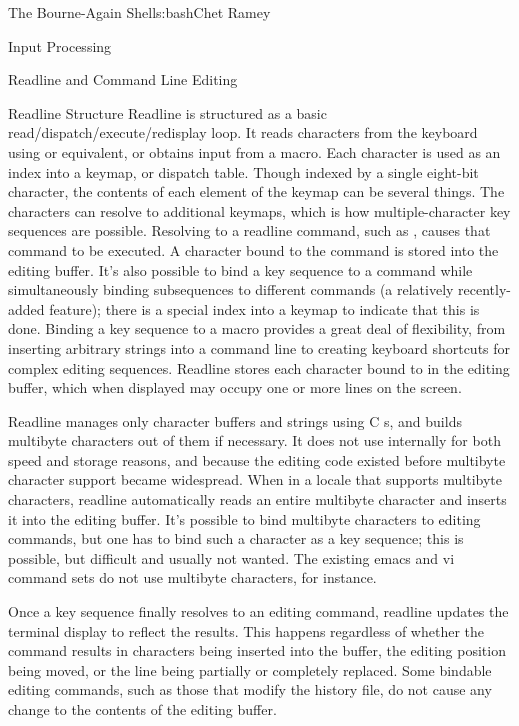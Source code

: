 \begin{aosachapter}{The Bourne-Again Shell}{s:bash}{Chet Ramey}
\begin{aosasect1}{Input Processing}
\begin{aosasect2}{Readline and Command Line Editing}
\begin{aosasect3}{Readline Structure}
Readline is structured as a basic read/dispatch/execute/redisplay
loop.  It reads characters from the keyboard using  or
equivalent, or obtains input from a macro.  Each character is used as
an index into a keymap, or dispatch table.  Though indexed by a single
eight-bit character, the contents of each element of the keymap can be
several things.  The characters can resolve to additional keymaps,
which is how multiple-character key sequences are possible.  Resolving
to a readline command, such as , causes that
command to be executed.
A character bound to the  command is stored into the
editing buffer.
It's also possible to bind a key sequence to
a command while simultaneously binding subsequences to different
commands (a relatively recently-added feature); there is a special
index into a keymap to indicate that this is done.  Binding a key
sequence to a macro provides a great deal of flexibility, from
inserting arbitrary strings into a command line to creating
keyboard shortcuts for complex editing sequences.  Readline stores
each character bound to  in the
editing buffer, which when displayed may occupy one or more lines on
the screen.

Readline manages only character buffers and strings using C
s, and builds multibyte characters out of them if
necessary.  It does not use  internally for both speed
and storage reasons, and because the editing code existed before
multibyte character support became widespread.  When in a locale that
supports multibyte characters, readline automatically reads an entire
multibyte character and inserts it into the editing buffer.  It's
possible to bind multibyte characters to editing commands, but one has
to bind such a character as a key sequence; this is possible, but
difficult and usually not wanted.  The existing emacs and vi command
sets do not use multibyte characters, for instance.

Once a key sequence finally resolves to an editing command,
readline updates the terminal display to reflect the
results.
This happens regardless of whether the command
results in characters being inserted into the buffer, the editing
position being moved, or the line being partially or completely
replaced.
Some bindable editing commands, such as those that modify
the history file, do not cause any change to the contents of the
editing buffer.


\end{aosasect3}
\end{aosasect2}
\end{aosasect1}
\end{aosachapter}
